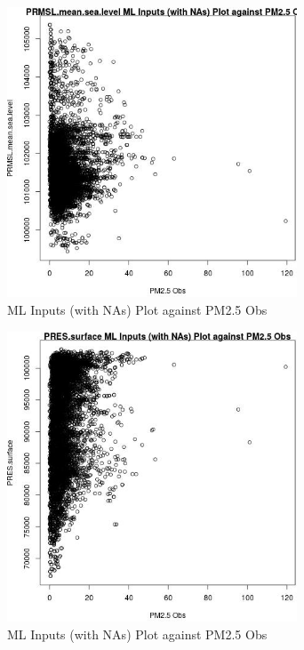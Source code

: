 \begin{figure} 
\centering  
\includegraphics[width=0.77\textwidth]{Code_Outputs/Report_ML_input_PM25_Step4_part_e_de_duplicated_aves_compiled_2019-05-18wNAs_PRMSLmeansealevelvPM25_Obs.jpg} 
\caption{\label{fig:Report_ML_input_PM25_Step4_part_e_de_duplicated_aves_compiled_2019-05-18wNAsPRMSLmeansealevelvPM25_Obs}ML Inputs (with NAs) Plot against PM2.5 Obs} 
\end{figure} 
 

\begin{figure} 
\centering  
\includegraphics[width=0.77\textwidth]{Code_Outputs/Report_ML_input_PM25_Step4_part_e_de_duplicated_aves_compiled_2019-05-18wNAs_PRESsurfacevPM25_Obs.jpg} 
\caption{\label{fig:Report_ML_input_PM25_Step4_part_e_de_duplicated_aves_compiled_2019-05-18wNAsPRESsurfacevPM25_Obs}ML Inputs (with NAs) Plot against PM2.5 Obs} 
\end{figure} 
 


